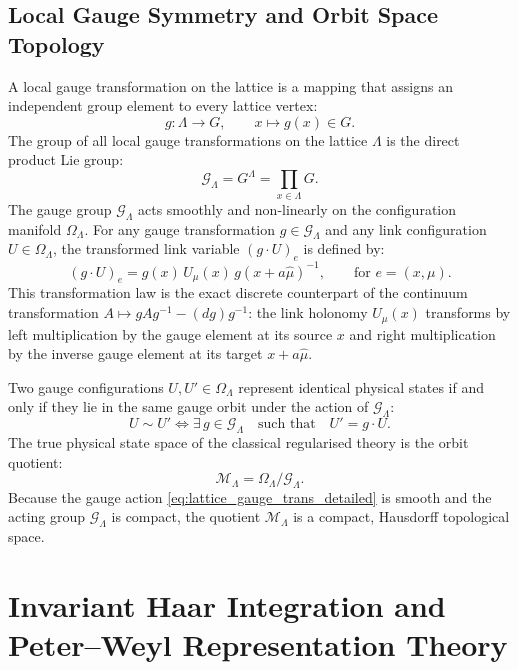\subsection{Local Gauge Symmetry and Orbit Space Topology}
\label{subsec:local_gauge_symmetry}
A local gauge transformation on the lattice is a mapping that assigns an independent group element to every lattice vertex:
\begin{equation}
g : \Lambda \to G, \qquad x \mapsto g(x) \in G.
\end{equation}
The group of all local gauge transformations on the lattice $\Lambda$ is the direct product Lie group:
\begin{equation}
\mathcal{G}_\Lambda = G^\Lambda = \prod_{x \in \Lambda} G.
\end{equation}
The gauge group $\mathcal{G}_\Lambda$ acts smoothly and non-linearly on the configuration manifold $\Omega_\Lambda$. For any gauge transformation $g \in \mathcal{G}_\Lambda$ and any link configuration $U \in \Omega_\Lambda$, the transformed link variable $(g \cdot U)_e$ is defined by:
\begin{equation}
\label{eq:lattice_gauge_trans_detailed}
(g \cdot U)_e = g(x) \, U_\mu(x) \, g(x + a\hat{\mu})^{-1}, \qquad \text{for } e = (x, \mu).
\end{equation}
This transformation law is the exact discrete counterpart of the continuum transformation $A \mapsto g A g^{-1} - (dg) g^{-1}$: the link holonomy $U_\mu(x)$ transforms by left multiplication by the gauge element at its source $x$ and right multiplication by the inverse gauge element at its target $x + a\hat{\mu}$.

Two gauge configurations $U, U' \in \Omega_\Lambda$ represent identical physical states if and only if they lie in the same gauge orbit under the action of $\mathcal{G}_\Lambda$:
\begin{equation}
U \sim U' \iff \exists \, g \in \mathcal{G}_\Lambda \quad \text{such that} \quad U' = g \cdot U.
\end{equation}
The true physical state space of the classical regularised theory is the orbit quotient:
\begin{equation}
\mathcal{M}_\Lambda = \Omega_\Lambda / \mathcal{G}_\Lambda.
\end{equation}
Because the gauge action \eqref{eq:lattice_gauge_trans_detailed} is smooth and the acting group $\mathcal{G}_\Lambda$ is compact, the quotient $\mathcal{M}_\Lambda$ is a compact, Hausdorff topological space.

\section{Invariant Haar Integration and Peter--Weyl Representation Theory}
\label{sec:haar_measure}

